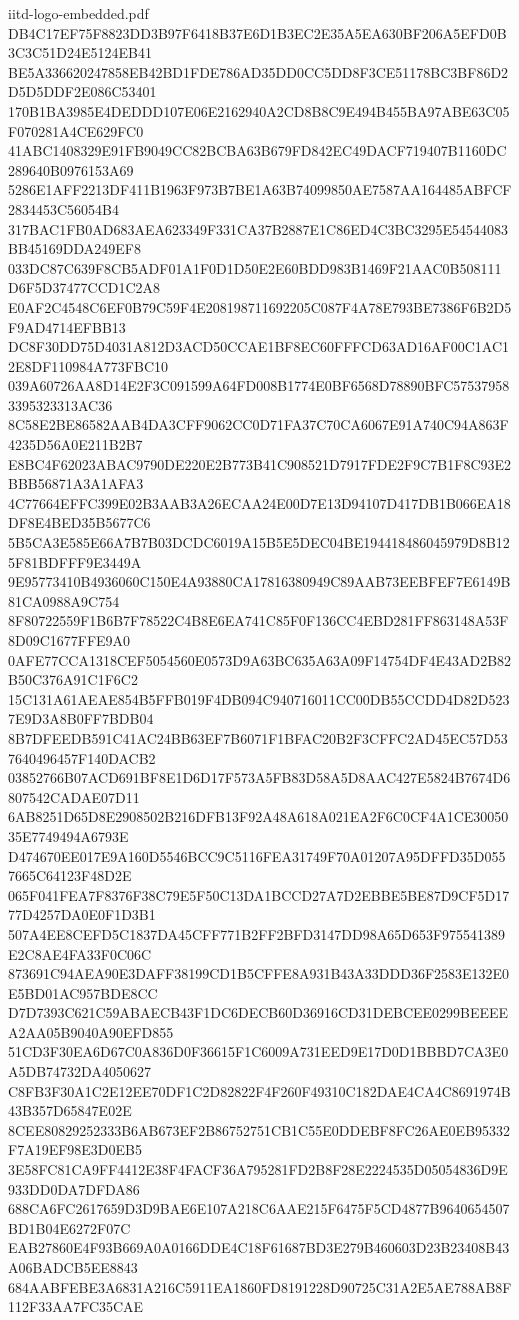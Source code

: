 \begin{filecontents*}[overwrite]{iitd-logo-embedded.pdf}
DB4C17EF75F8823DD3B97F6418B37E6D1B3EC2E35A5EA630BF206A5EFD0B3C3C51D24E5124EB41
BE5A336620247858EB42BD1FDE786AD35DD0CC5DD8F3CE51178BC3BF86D2D5D5DDF2E086C53401
170B1BA3985E4DEDDD107E06E2162940A2CD8B8C9E494B455BA97ABE63C05F070281A4CE629FC0
41ABC1408329E91FB9049CC82BCBA63B679FD842EC49DACF719407B1160DC289640B0976153A69
5286E1AFF2213DF411B1963F973B7BE1A63B74099850AE7587AA164485ABFCF2834453C56054B4
317BAC1FB0AD683AEA623349F331CA37B2887E1C86ED4C3BC3295E54544083BB45169DDA249EF8
033DC87C639F8CB5ADF01A1F0D1D50E2E60BDD983B1469F21AAC0B508111D6F5D37477CCD1C2A8
E0AF2C4548C6EF0B79C59F4E208198711692205C087F4A78E793BE7386F6B2D5F9AD4714EFBB13
DC8F30DD75D4031A812D3ACD50CCAE1BF8EC60FFFCD63AD16AF00C1AC12E8DF110984A773FBC10
039A60726AA8D14E2F3C091599A64FD008B1774E0BF6568D78890BFC575379583395323313AC36
8C58E2BE86582AAB4DA3CFF9062CC0D71FA37C70CA6067E91A740C94A863F4235D56A0E211B2B7
E8BC4F62023ABAC9790DE220E2B773B41C908521D7917FDE2F9C7B1F8C93E2BBB56871A3A1AFA3
4C77664EFFC399E02B3AAB3A26ECAA24E00D7E13D94107D417DB1B066EA18DF8E4BED35B5677C6
5B5CA3E585E66A7B7B03DCDC6019A15B5E5DEC04BE194418486045979D8B125F81BDFFF9E3449A
9E95773410B4936060C150E4A93880CA17816380949C89AAB73EEBFEF7E6149B81CA0988A9C754
8F80722559F1B6B7F78522C4B8E6EA741C85F0F136CC4EBD281FF863148A53F8D09C1677FFE9A0
0AFE77CCA1318CEF5054560E0573D9A63BC635A63A09F14754DF4E43AD2B82B50C376A91C1F6C2
15C131A61AEAE854B5FFB019F4DB094C940716011CC00DB55CCDD4D82D5237E9D3A8B0FF7BDB04
8B7DFEEDB591C41AC24BB63EF7B6071F1BFAC20B2F3CFFC2AD45EC57D537640496457F140DACB2
03852766B07ACD691BF8E1D6D17F573A5FB83D58A5D8AAC427E5824B7674D6807542CADAE07D11
6AB8251D65D8E2908502B216DFB13F92A48A618A021EA2F6C0CF4A1CE3005035E7749494A6793E
D474670EE017E9A160D5546BCC9C5116FEA31749F70A01207A95DFFD35D0557665C64123F48D2E
065F041FEA7F8376F38C79E5F50C13DA1BCCD27A7D2EBBE5BE87D9CF5D1777D4257DA0E0F1D3B1
507A4EE8CEFD5C1837DA45CFF771B2FF2BFD3147DD98A65D653F975541389E2C8AE4FA33F0C06C
873691C94AEA90E3DAFF38199CD1B5CFFE8A931B43A33DDD36F2583E132E0E5BD01AC957BDE8CC
D7D7393C621C59ABAECB43F1DC6DECB60D36916CD31DEBCEE0299BEEEEA2AA05B9040A90EFD855
51CD3F30EA6D67C0A836D0F36615F1C6009A731EED9E17D0D1BBBD7CA3E0A5DB74732DA4050627
C8FB3F30A1C2E12EE70DF1C2D82822F4F260F49310C182DAE4CA4C8691974B43B357D65847E02E
8CEE80829252333B6AB673EF2B86752751CB1C55E0DDEBF8FC26AE0EB95332F7A19EF98E3D0EB5
3E58FC81CA9FF4412E38F4FACF36A795281FD2B8F28E2224535D05054836D9E933DD0DA7DFDA86
688CA6FC2617659D3D9BAE6E107A218C6AAE215F6475F5CD4877B9640654507BD1B04E6272F07C
EAB27860E4F93B669A0A0166DDE4C18F61687BD3E279B460603D23B23408B43A06BADCB5EE8843
684AABFEBE3A6831A216C5911EA1860FD8191228D90725C31A2E5AE788AB8F112F33AA7FC35CAE

\end{filecontents*}
